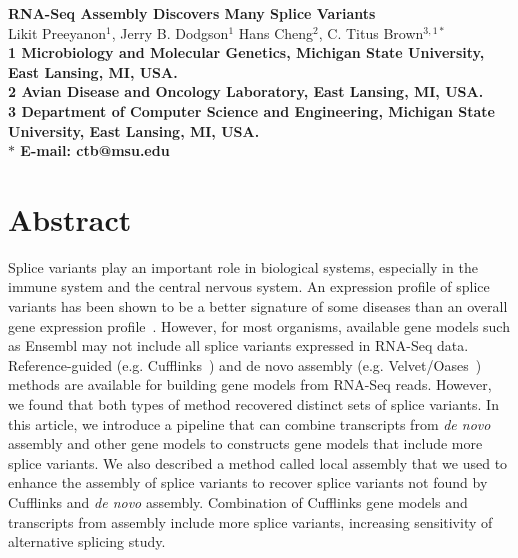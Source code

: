 \documentclass[10pt]{article}
\date{}
\begin{document}
\begin{flushleft}
{\Large
\textbf{RNA-Seq Assembly Discovers Many Splice Variants}
}
\\
Likit Preeyanon$^{1}$, 
Jerry B. Dodgson$^{1}$
Hans Cheng$^{2}$, 
C. Titus Brown$^{3,1 \ast}$
\\
\bf{1} Microbiology and Molecular Genetics, Michigan State University, East Lansing, MI, USA.
\\
\bf{2} Avian Disease and Oncology Laboratory, East Lansing, MI, USA.
\\

\bf{3} Department of Computer Science and Engineering, Michigan State University, East Lansing, MI, USA.
\\
$\ast$ E-mail: ctb@msu.edu
\end{flushleft}

\section*{Abstract}
Splice variants play an important role in biological systems, especially in the
immune system and the central nervous system. An expression profile of splice
variants has been shown to be a better signature of some diseases than an
overall gene expression profile~\cite{zhang2013isoform}. However, for most
organisms, available gene models such as Ensembl may not include all splice
variants expressed in RNA-Seq data. Reference-guided (e.g.
Cufflinks~\cite{Trapnell:2010kd}) and de novo assembly (e.g.
Velvet/Oases~\cite{Schulz:2012je}) methods are available for building gene
models from RNA-Seq reads. However, we found that both types of method recovered
distinct sets of splice variants.  In this article, we introduce a pipeline that
can combine transcripts from {\em de novo} assembly and other gene models to
constructs gene models that include more splice variants. We also described a
method called local assembly that we used to enhance the assembly of splice
variants to recover splice variants not found by Cufflinks and {\em de novo}
assembly.  Combination of Cufflinks gene models and transcripts from assembly
include more splice variants, increasing sensitivity of alternative splicing
study.
\end{document}

